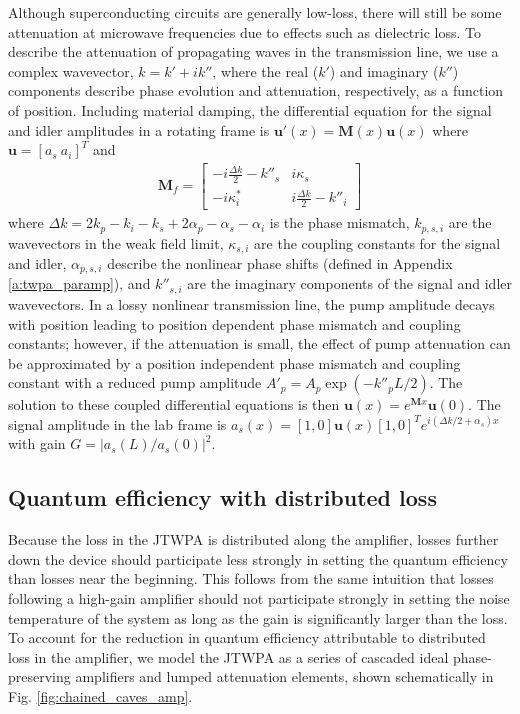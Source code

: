 Although superconducting circuits are generally low-loss, there will still be some attenuation at microwave frequencies due to effects such as dielectric loss.  To describe the attenuation of propagating waves in the transmission line, we use a complex wavevector, $k=k'+i k''$, where the real ($k'$) and imaginary ($k''$) components describe phase evolution and attenuation, respectively, as a function of position. Including material damping, the differential equation for the signal and idler amplitudes in a rotating frame is $\mathbf{u}'(x)=\mathbf{M}(x) \mathbf{u}(x)$ where $\mathbf{u}=[a_s  ~ a_i]^T$ and 
\begin{align}
\mathbf{M}_f = 
\begin{bmatrix}
- i\frac{\Delta k}{2}-k''_s & i\kappa_s \\
-i\kappa^*_i            & i\frac{\Delta k}{2}-k''_i
\end{bmatrix} \label{eq:signallossy}
\end{align} 
where $\Delta k=2k_p-k_i-k_s+2\alpha_p-\alpha_s-\alpha_i$ is the phase mismatch, $k_{p,s,i}$ are the wavevectors in the weak field limit, $\kappa_{s,i}$ are the coupling constants for the signal and idler, $\alpha_{p,s,i}$ describe the nonlinear phase shifts (defined in Appendix \ref{a:twpa_paramp}), and $k''_{s,i}$ are the imaginary components of the signal and idler wavevectors. In a lossy nonlinear transmission line, the pump amplitude decays with position leading to position dependent phase mismatch and coupling constants; however, if the attenuation is small, the effect of pump attenuation can be approximated by a position independent phase mismatch and coupling constant with a reduced pump amplitude $A'_p=A_p\exp({-k''_p L/2})$. The solution to these coupled differential equations is then $\mathbf{u}(x)=e^{\mathbf{M}x} \mathbf{u}(0)$. The signal amplitude in the lab frame is $a_s(x)=[1,0]\mathbf{u}(x)[1,0]^T e^{i(\Delta k/2 + \alpha_s)x}$ with gain $G=|a_s(L)/a_s(0)|^2$. 

\subsection{Quantum efficiency with distributed loss}\label{s:twpa_dist_loss}

Because the loss in the JTWPA is distributed along the amplifier, losses further down the device should participate less strongly in setting the quantum efficiency than losses near the beginning.  This follows from the same intuition that losses following a high-gain amplifier should not participate strongly in setting the noise temperature of the system as long as the gain is significantly larger than the loss.  To account for the reduction in quantum efficiency attributable to distributed loss in the amplifier, we model the JTWPA as a series of cascaded ideal phase-preserving amplifiers and lumped attenuation elements, shown schematically in Fig. \ref{fig:chained_caves_amp}.


